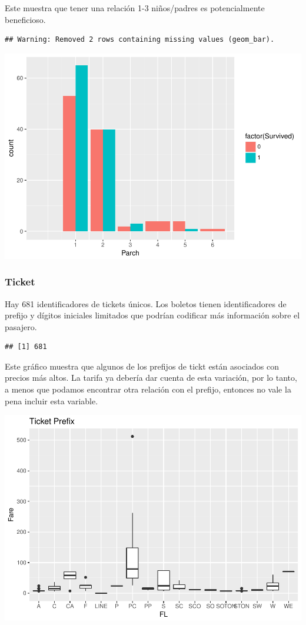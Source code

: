 \documentclass[]{article}
\begin{document}
Este muestra que tener una relación 1-3 niños/padres es potencialmente
beneficioso.

\begin{verbatim}
## Warning: Removed 2 rows containing missing values (geom_bar).
\end{verbatim}

\includegraphics{titanicDataClean_files/figure-latex/unnamed-chunk-5-1.pdf}

\subsubsection{Ticket}\label{ticket}

Hay 681 identificadores de tickets únicos. Los boletos tienen
identificadores de prefijo y dígitos iniciales limitados que podrían
codificar más información sobre el pasajero.

\begin{verbatim}
## [1] 681
\end{verbatim}

Este gráfico muestra que algunos de los prefijos de tickt están
asociados con precios más altos. La tarifa ya debería dar cuenta de esta
variación, por lo tanto, a menos que podamos encontrar otra relación con
el prefijo, entonces no vale la pena incluir esta variable.

\includegraphics{titanicDataClean_files/figure-latex/plot-1.pdf}
\end{document}
